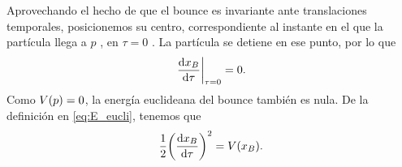 Aprovechando el hecho de que el bounce es invariante ante translaciones temporales, posicionemos su centro, correspondiente al instante en el que la partícula llega a $p$ , en $\tau = 0$ \cite{coleman1977fate}. La partícula se detiene en ese punto, por lo que
\begin{equation} \label{eq:vel}
\eval{\dv{x_B}{\tau}}_{\tau = 0} = 0.
\end{equation}
Como $V\qty(p) = 0$, la energía euclideana del bounce también es nula. De la definición en \eqref{eq:E_eucli}, tenemos que
\begin{equation} \label{eq:K=V}
\frac{1}{2}\qty(\dv{x_B}{\tau})^2 = V\qty(x_B).
\end{equation}

